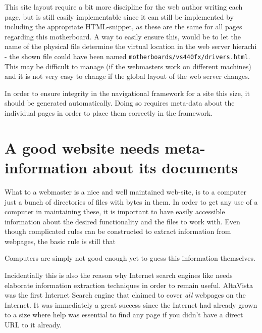 This site layout require a bit more discipline for the web author
writing each page, but is still easily implementable since it can
still be implemented by including the appropriate HTML-snippet, as
these are the same for all pages regarding this motherboard.  A way to
easily ensure this, would be to let the name of the physical file
determine the virtual location in the web server hierachi - the shown
file could have been named
\texttt{motherboards/vs440fx/drivers.html}.  This may be difficult to
manage (if the webmasters work on different machines) and it is not
very easy to change if the global layout of the web server changes.

In order to ensure integrity in the navigational framework for a site
this size, it should be generated automatically.  Doing so requires
meta-data about the individual pages in order to place them correctly
in the framework.

\section{A good website needs meta-information about its documents}

What to a webmaster is a nice and well maintained web-site, is to a
computer just a bunch of directories of files with bytes in them.  In
order to get any use of a computer in maintaining these, it is
important to have easily accessible information about the desired
functionality and the files to work with.  Even though complicated
rules can be constructed to extract information from webpages, the
basic rule is still that

\begin{center}
\end{center}

Computers are simply not good enough yet to guess this information
themselves.

Incidentially this is also the reason why Internet search engines like
 needs elaborate
information extraction techniques in order to remain useful.
AltaVista was the first Internet Search engine that claimed to cover
\textit{all} webpages on the Internet.  It was immediately a great
success since the Internet had already grown to a size where help was
essential to find any page if you didn't have a direct URL to it
already.

